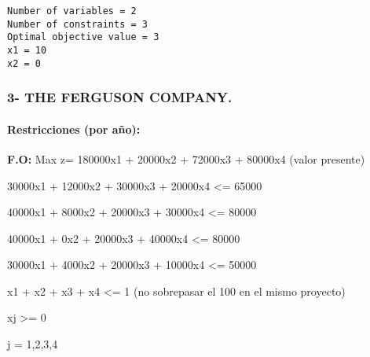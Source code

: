 \documentclass[11pt]{article}
\begin{document}
    \begin{Verbatim}[commandchars=\\\{\}]
Number of variables = 2
Number of constraints = 3
Optimal objective value = 3
x1 = 10
x2 = 0

    \end{Verbatim}

    \subsubsection{\texorpdfstring{3- \textbf{THE FERGUSON
COMPANY.}}{3- THE FERGUSON COMPANY.}}\label{the-ferguson-company.}

\paragraph{Restricciones (por año):}\label{restricciones-por-auxf1o}

\textbf{F.O:} Max z= 180000x1 + 20000x2 + 72000x3 + 80000x4 (valor
presente)

30000x1 + 12000x2 + 30000x3 + 20000x4 \textless{}= 65000

40000x1 + 8000x2 + 20000x3 + 30000x4 \textless{}= 80000

40000x1 + 0x2 + 20000x3 + 40000x4 \textless{}= 80000

30000x1 + 4000x2 + 20000x3 + 10000x4 \textless{}= 50000

x1 + x2 + x3 + x4 \textless{}= 1 (no sobrepasar el 100 en el mismo
proyecto)

xj \textgreater{}= 0

j = 1,2,3,4
\end{document}
